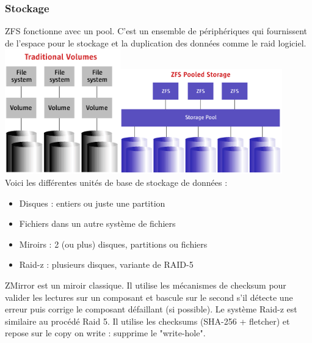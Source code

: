 \documentclass[a4paper,11pt]{report}
\begin{document}
	\subsubsection{Stockage}
	ZFS fonctionne avec un pool. C'est un ensemble de périphériques qui fournissent de l’espace pour le stockage et la duplication des données comme le raid logiciel. \\
	\includegraphics[width=5cm]{img/volumes_tradicionais.png}\includegraphics[width=7cm]{img/armazenamento_pooled_zfs.png}\\
	Voici les différentes unités de base de stockage de données :\\
	\begin{itemize}
		 \item Disques : entiers ou juste une partition
		 \item Fichiers dans un autre système de fichiers
		 \item Miroirs : 2 (ou plus) disques, partitions ou fichiers
		 \item Raid-z : plusieurs disques, variante de RAID-5\\
	\end{itemize}
	ZMirror est un miroir classique. Il utilise les mécanismes de checksum pour valider les lectures sur un composant et bascule sur le second s'il détecte une erreur puis corrige le composant défaillant (si possible). Le système Raid-z est similaire au procédé Raid 5. Il utilise les checksums (SHA-256 + fletcher) et repose sur le copy on write : supprime le "write-hole".
\end{document}
